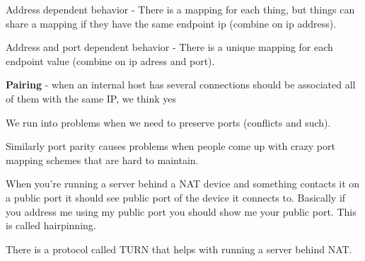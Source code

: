 \documentclass[12pt]{article}
\begin{document}
Address dependent behavior - There is a mapping for each thing, but things can share a mapping if they have the same endpoint ip (combine on ip address).

Address and port dependent behavior - There is a unique mapping for each endpoint value (combine on ip adress and port).



\textbf{Pairing} - when an internal host has several connections should be associated all of them with the same IP, we think yes

We run into problems when we need to preserve ports (conflicts and such).

Similarly port parity causes problems when people come up with crazy port mapping schemes that are hard to maintain.


When you're running a server behind a NAT device and something contacts it on a public port it should see public port of the device it connects to. Basically if you address me using my public port you should show me your public port. This is called hairpinning.


There is a protocol called TURN that helps with running a server behind NAT.
\end{document}
